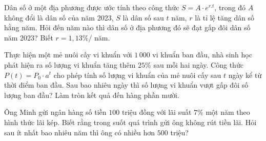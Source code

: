 \begin{ex}%
	Dân số ở một địa phương được ước tính theo công thức $S=A\cdot e^{r.t}$, trong đó $A$ không đổi là dân số của năm 2023, $S$ là dân số sau $t$ năm, $r$ là tỉ lệ tăng dân số hằng năm. Hỏi đến năm nào thì dân số ở địa phương đó sẽ đạt gấp đôi dân số năm  2023? Biết $r=1,13\% /$ năm.
\end{ex}

\begin{ex}%
	Thực hiện một mẻ nuôi cấy vi khuẩn với $1\,000$ vi khuẩn ban đầu, nhà sinh học phát hiện ra số lượng vi khuẩn tăng thêm $25\%$ sau mỗi hai ngày. Công thức $P(t)=P_0\cdot a^t$ cho phép tính số lượng vi khuẩn của mẻ nuôi cấy sau $t$ ngày kể từ  thời điểm ban đầu. Sau bao nhiêu ngày thì số lượng vi khuẩn vượt gấp đôi số lượng ban đầu? Làm tròn kết quả đến hàng phần mười.
\end{ex}

\begin{ex}%
	Ông Minh gửi ngân hàng số tiền $100$ triệu đồng với lãi suất $7\%$ một năm theo hình thức lãi kép. Biết rằng trong suốt quá trình gửi ông không rút tiền lãi. Hỏi sau ít nhất bao nhiêu  năm thì ông có nhiều hơn $500$ triệu?
\end{ex}

